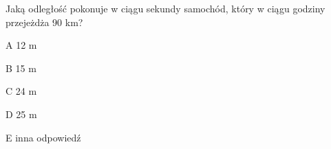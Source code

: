 \begin{tresc}
Jaką odległość pokonuje w ciągu sekundy samochód, który w ciągu godziny przejeżdża 90 km?
\end{tresc}
\begin{wariant}{A} 12 m \end{wariant}
\begin{wariant}{B} 15 m \end{wariant}
\begin{wariant}{C} 24 m \end{wariant}
\begin{wariant}{D} 25 m \end{wariant}
\begin{wariant}{E} inna odpowiedź \end{wariant}
